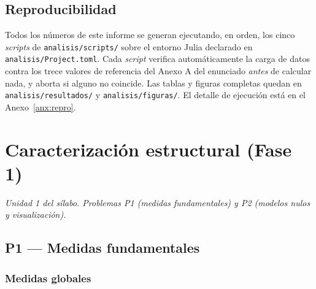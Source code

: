 \documentclass[10pt,a4paper]{extarticle}
\newcommand{\code}[1]{\texttt{\small #1}}
\begin{document}
\subsection{Reproducibilidad}

Todos los números de este informe se generan ejecutando, en orden, los cinco
\textit{scripts} de \code{analisis/scripts/} sobre el entorno Julia declarado en
\code{analisis/Project.toml}. Cada \textit{script} verifica automáticamente la carga de
datos contra los trece valores de referencia del Anexo A del enunciado \textit{antes} de
calcular nada, y aborta si alguno no coincide. Las tablas y figuras completas quedan en
\code{analisis/resultados/} y \code{analisis/figuras/}. El detalle de ejecución está en el
Anexo~\ref{anx:repro}.

\section{Caracterización estructural (Fase 1)}

\textit{Unidad 1 del sílabo. Problemas P1 (medidas fundamentales) y P2 (modelos nulos y
visualización).}

\subsection{P1 --- Medidas fundamentales}

\subsubsection{Medidas globales}
\end{document}
